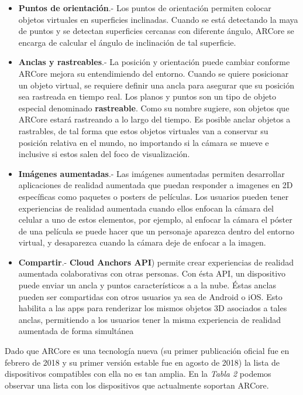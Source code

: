 \begin{itemize}
	\item \textbf{Puntos de orientación}.- Los puntos de orientación permiten colocar objetos virtuales en superficies inclinadas. Cuando se está detectando la maya de puntos y se detectan superficies cercanas con diferente ángulo, ARCore se encarga de calcular el ángulo de inclinación de tal superficie.
	
	\item \textbf{Anclas y rastreables}.- La posición y orientación puede cambiar conforme ARCore mejora su entendimiendo del entorno. Cuando se quiere posicionar un objeto virtual, se requiere definir una ancla para asegurar que su posición sea rastreada en tiempo real. Los planos y puntos son un tipo de objeto especial denominado \textbf{rastreable}. Como su nombre sugiere, son objetos que ARCore estará rastreando a lo largo del tiempo. Es posible anclar objetos a rastrables, de tal forma que estos objetos virtuales van a conservar su posición relativa en el mundo, no importando si la cámara se mueve e inclusive si estos salen del foco de visualización.
	
	\item \textbf{Imágenes aumentadas}.- Las imágenes aumentadas permiten desarrollar aplicaciones de realidad aumentada que puedan responder a imagenes en 2D específicas como paquetes o posters de películas. Los usuarios pueden tener experiencias de realidad aumentada cuando ellos enfocan la cámara del celular a uno de estos elementos, por ejemplo, al enfocar la cámara el póster de una película se puede hacer que un personaje aparezca dentro del entorno virtual, y desaparezca cuando la cámara deje de enfocar a la imagen.
	
	\item \textbf{Compartir}.- \textbf{Cloud Anchors API}) permite crear experiencias de realidad aumentada colaborativas con otras personas. Con ésta API, un dispositivo puede enviar un ancla y puntos característicos a a la nube. Éstas anclas pueden ser compartidas con otros usuarios ya sea de Android o iOS. Esto habilita a las apps para renderizar los mismos objetos 3D asociados a tales anclas, permitiendo a los usuarios tener la misma experiencia de realidad aumentada de forma simultánea
	
\end{itemize}

\noindent
Dado que ARCore es una tecnología nueva (su primer publicación oficial fue en febrero de 2018 y su primer versión estable fue en agosto de 2018) la lista de dispositivos compatibles con ella no es tan amplia. En la \textit{Tabla 2} podemos observar una lista con los dispositivos que actualmente soportan ARCore.\cite{B14}

